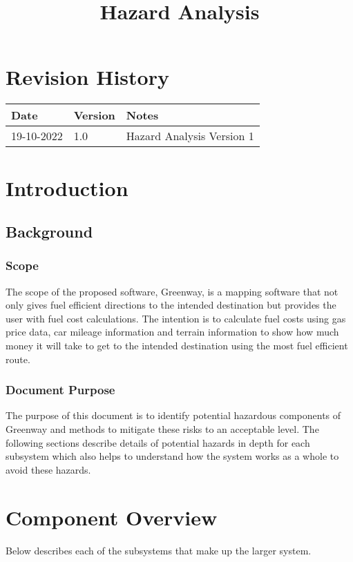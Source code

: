 \documentclass{article}
\title{Hazard Analysis\\\progname}
\author{\authname}
\date{}
\begin{document}
\maketitle

\newpage

\section*{Revision History}

\begin{tabularx}{\textwidth}{p{3cm}p{2cm}X}
\toprule {\bf Date} & {\bf Version} & {\bf Notes}\\
\midrule
19-10-2022 & 1.0 & Hazard Analysis Version 1\\
\bottomrule
\end{tabularx}

\newpage

\tableofcontents

\newpage

\section{Introduction}
\subsection{Background}
\subsubsection{Scope}
The scope of the proposed software, Greenway, is a mapping software that not only 
gives fuel efficient directions to the intended destination but provides the user with fuel cost calculations.
The intention is to calculate fuel costs using gas price data, car mileage information and terrain information
to show how much money it will take to get to the intended destination using the most fuel efficient route.

\subsubsection{Document Purpose}
The purpose of this document is to identify potential hazardous components of Greenway
and methods to mitigate these risks to an acceptable level. The following sections describe
details of potential hazards in depth for each subsystem which also helps to understand how
the system works as a whole to avoid these hazards.

\section{Component Overview}
Below describes each of the subsystems that make up the larger system.
\end{document}
